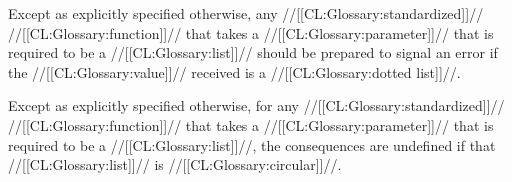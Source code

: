 \endsubsubsection%







Except as explicitly specified otherwise,
any //[[CL:Glossary:standardized]]// //[[CL:Glossary:function]]// that takes a //[[CL:Glossary:parameter]]//
that is required to be a //[[CL:Glossary:list]]// should be prepared to signal 
an error  if the //[[CL:Glossary:value]]// received is a //[[CL:Glossary:dotted list]]//.




Except as explicitly specified otherwise,
for any //[[CL:Glossary:standardized]]// //[[CL:Glossary:function]]// that takes a //[[CL:Glossary:parameter]]//
that is required to be a //[[CL:Glossary:list]]//, 
the consequences are undefined 
if that //[[CL:Glossary:list]]// is //[[CL:Glossary:circular]]//.

\endsubsubsection%

\endsubsection%
